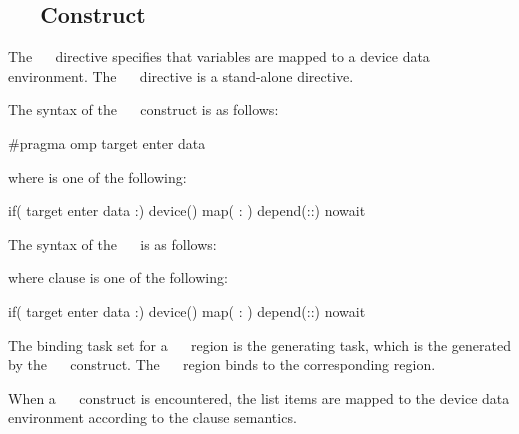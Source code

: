 \subsection{~~ Construct}
\label{subsec:target enter data Construct}
\summary
The ~~ directive specifies that variables are mapped to a device data environment. The ~~ directive is a stand-alone directive.
\syntax
\begin{ccppspecific}
The syntax of the ~~ construct is as follows:
\begin{ompcPragma}
#pragma omp target enter data 
\end{ompcPragma}
where  is one of the following:
\begin{indentedcodelist}
if(\plc{[} target enter data :\plc{] scalar-expression})
device()
map(\plc{[ [map-type-modifier[,]] map-type} : \plc{] list})
depend(\plc{[depend-modifier}:\plc{]dependence-type }:)
nowait
\end{indentedcodelist}
\end{ccppspecific}
\begin{fortranspecific}
The syntax of the ~~ is as follows:
where clause is one of the following:
\begin{indentedcodelist}
if(\plc{[} target enter data :\plc{] scalar-logical-expression})
device()
map(\plc{[ [map-type-modifier[,]] map-type} : \plc{] list})
depend(\plc{[depend-modifier}:\plc{]dependence-type }:)
nowait
\end{indentedcodelist}
\end{fortranspecific}

\binding
The binding task set for a ~~ region is
the generating task, which is the  generated by the
~~ construct. The
~~ region binds to the corresponding
 region.

\descr
When a ~~ construct is encountered, the list items are mapped to the device data environment according to the  clause semantics.

